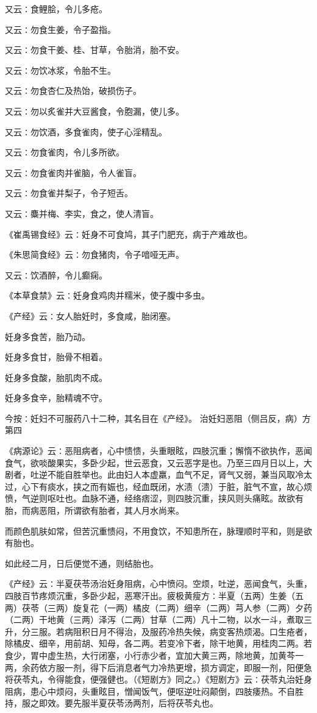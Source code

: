 \documentclass[a4paper,12pt,UTF8,twoside]{ctexbook}
\begin{document}
又云∶食鲤脍，令儿多疮。

又云∶勿食生姜，令子盈指。

又云∶勿食干姜、桂、甘草，令胎消，胎不安。

又云∶勿饮冰浆，令胎不生。

又云∶勿食杏仁及热饴，破损伤子。

又云∶勿以炙雀并大豆酱食，令胞漏，使儿多。

又云∶勿饮酒，多食雀肉，使子心淫精乱。

又云∶勿食雀肉，令儿多所欲。

又云∶勿食雀肉并雀脑，令人雀盲。

又云∶勿食雀并梨子，令子短舌。

又云∶麋并梅、李实，食之，使人清盲。

《崔禹锡食经》云∶妊身不可食鸠，其子门肥充，病于产难故也。

《朱思简食经》云∶勿食猪肉，令子喑哑无声。

又云∶饮酒醉，令儿癫痫。

《本草食禁》云∶妊身食鸡肉并糯米，使子腹中多虫。

《产经》云∶女人胎妊时，多食咸，胎闭塞。

妊身多食苦，胎乃动。

妊身多食甘，胎骨不相着。

妊身多食酸，胎肌肉不成。

妊身多食辛，胎精魂不守。

今按∶妊妇不可服药八十二种，其名目在《产经》。
治妊妇恶阻（侧吕反，病）方第四

《病源论》云∶恶阻病者，心中愦愦，头重眼眩，四肢沉重；懈惰不欲执作，恶闻食气，欲啖酸果实，多卧少起，世云恶食，又云恶字是也。乃至三四月日以上，大剧者，吐逆不能自胜举也。此由妇人本虚羸，血气不足，肾气又弱，兼当风取冷太过，心下有痰水，挟之而有娠也，经血既闭，水渍（溃）于脏，脏气不宣，故心烦愤，气逆则呕吐也。血脉不通，经络痞涩，则四肢沉重，挟风则头痛眩。故欲有胎，而病恶阻，所谓欲有胎者，其人月水尚来。

而颜色肌肤如常，但苦沉重愦闷，不用食饮，不知患所在，脉理顺时平和，则是欲有胎也。

如此经二月，日后便觉不通，则结胎也。

《产经》云∶半夏茯苓汤治妊身阻病，心中愤闷。空烦，吐逆，恶闻食气，头重，四肢百节疼烦沉重，多卧少起，恶寒汗出。疲极黄瘦方∶半夏（五两）生姜（五两）茯苓（三两）旋复花（一两）橘皮（二两）细辛（二两）芎人参（二两）夕药（二两）干地黄（三两）泽泻（二两）甘草（二两）凡十二物，以水一斗，煮取三升，分三服。若病阻积日月不得治，及服药冷热失候，病变客热烦渴。口生疮者，除橘皮、细辛，用前胡、知母，各二两。若变冷下者，除干地黄，用桂肉二两。若食少，胃中虚生热，大行闭塞，小行赤少者，宜加大黄三两，除地黄，加黄芩一两，余药依方服一剂，得下后消息者气力冷热更增，损方调定，即服一剂，阳便急将茯苓丸，令得能食，便强健也。（《短剧方》同之。）《短剧方》云∶茯苓丸治妊身阻病，患心中烦闷，头重眩目，憎闻饭气，便呕逆吐闷颠倒，四肢痿热。不自胜持，服之即效。要先服半夏茯苓汤两剂，后将茯苓丸也。
\end{document}
